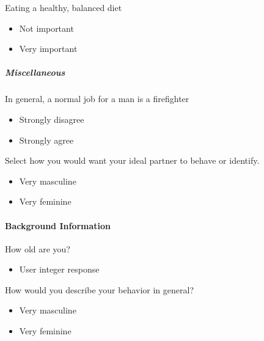 \documentclass[twoside]{report}
\begin{document}
\begin{multicols}{2}
Eating a healthy, balanced diet

\begin{itemize}
\item
  Not important
\end{itemize}

\begin{itemize}
\item
  Very important
\end{itemize}

\subparagraph{Miscellaneous}

In general, a normal job for a man is a firefighter

\begin{itemize}
\item
  Strongly disagree
\end{itemize}

\begin{itemize}
\item
  Strongly agree
\end{itemize}

Select how you would want your ideal partner to behave or identify.

\begin{itemize}
\item
  Very masculine
\end{itemize}

\begin{itemize}
\item
  Very feminine
\end{itemize}

\paragraph{Background Information}

How old are you?

\begin{itemize}
\item
  User integer response
\end{itemize}

How would you describe your behavior in general?

\begin{itemize}
\item
  Very masculine
\end{itemize}

\begin{itemize}
\item
  Very feminine
\end{itemize}


\end{multicols}
\end{document}
